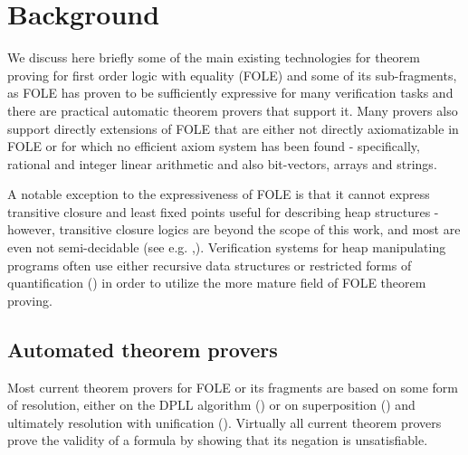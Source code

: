 \section*{Background}
We discuss here briefly some of the main existing technologies for theorem proving for first order logic with equality (FOLE) and some of its sub-fragments, as FOLE has proven to be sufficiently expressive for many verification tasks and there are practical automatic theorem provers that support it. 
Many provers also support directly extensions of FOLE that are either not directly axiomatizable in FOLE or for which no efficient axiom system has been found - specifically, rational and integer linear arithmetic and also bit-vectors, arrays and strings.

A notable exception to the expressiveness of FOLE is that it cannot express transitive closure and least fixed points useful for describing heap structures - however, transitive closure logics are beyond the scope of this work, and most are even not semi-decidable (see e.g. \cite{DBLP:journals/aml/GradelOR99},\cite{DBLP:conf/csl/ImmermanRRSY04}). Verification systems for heap manipulating programs often use either recursive data structures or restricted forms of quantification (\cite{MuellerSchwerhoffSummers16b}) 
in order to utilize the more mature field of FOLE theorem proving.

\subsection*{Automated theorem provers}
Most current theorem provers for FOLE or its fragments are based on some form of resolution, either on the DPLL algorithm (\cite{DBLP:journals/cacm/DavisLL62}) or on superposition (\cite{BachmairGanzingerSuperposition}) and ultimately resolution with unification (\cite{Robinson:1965:MLB:321250.321253}). Virtually all current theorem provers prove the validity of a formula by showing that its negation is unsatisfiable.

